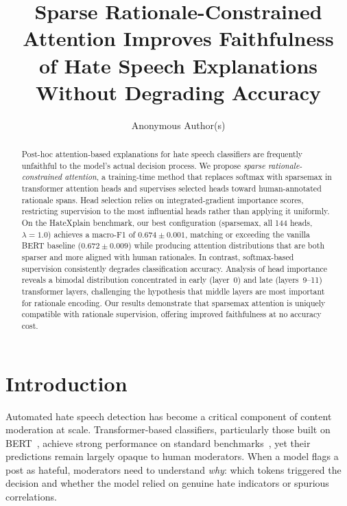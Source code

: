 \documentclass{article}
\title{Sparse Rationale-Constrained Attention Improves Faithfulness\\of Hate Speech Explanations Without Degrading Accuracy}
\author{
  Anonymous Author(s)
}
\begin{document}
\maketitle

\begin{abstract}
Post-hoc attention-based explanations for hate speech classifiers are
frequently unfaithful to the model's actual decision process.
We propose \emph{sparse rationale-constrained attention}, a training-time
method that replaces softmax with sparsemax in transformer attention heads
and supervises selected heads toward human-annotated rationale spans.
Head selection relies on integrated-gradient importance scores, restricting
supervision to the most influential heads rather than applying it uniformly.
On the HateXplain benchmark, our best configuration (sparsemax, all 144
heads, $\lambda{=}1.0$) achieves a macro-F1 of $0.674 \pm 0.001$,
matching or exceeding the vanilla BERT baseline ($0.672 \pm 0.009$) while
producing attention distributions that are both sparser and more aligned
with human rationales.
In contrast, softmax-based supervision consistently degrades classification
accuracy.
Analysis of head importance reveals a bimodal distribution concentrated in
early (layer~0) and late (layers~9--11) transformer layers, challenging
the hypothesis that middle layers are most important for rationale encoding.
Our results demonstrate that sparsemax attention is uniquely compatible
with rationale supervision, offering improved faithfulness at no accuracy cost.
\end{abstract}

\section{Introduction}
\label{sec:intro}

Automated hate speech detection has become a critical component of content
moderation at scale. Transformer-based classifiers, particularly those built
on BERT~\citep{devlin2019bert}, achieve strong performance on standard
benchmarks~\citep{mathew2021hatexplain}, yet their predictions remain largely
opaque to human moderators. When a model flags a post as hateful, moderators
need to understand \emph{why}: which tokens triggered the decision and whether
the model relied on genuine hate indicators or spurious correlations.
\end{document}

